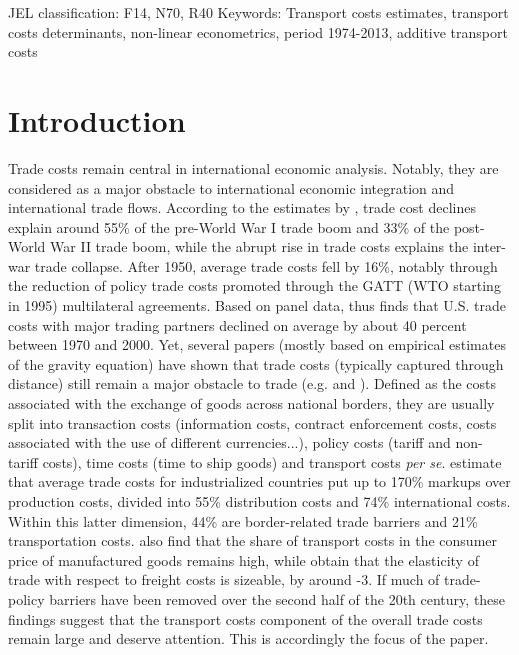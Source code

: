 \documentclass[a4paper,11pt]{article}
\begin{document}
\thispagestyle{empty} \pagestyle{plain} \setcounter{page}{1}



{\normalsize JEL classification: F14, N70, R40\newline
Keywords: Transport costs estimates, transport costs determinants, non-linear econometrics, period 1974-2013, additive transport costs }

{\normalsize \vspace{0cm} }

{\normalsize \titlepage }

{\normalsize \newpage }


\section{Introduction}


\noindent Trade costs remain central in international economic analysis. Notably, they are considered as a major obstacle to international economic integration and international trade flows. According to the estimates by \citet{Jacks08}, trade cost declines explain around 55\% of the pre-World War I trade boom and 33\% of the post-World War II trade boom, while the abrupt rise in trade costs explains the inter-war trade collapse. After 1950, average trade costs fell by 16\%, notably through the reduction of policy trade costs promoted through the GATT (WTO starting in 1995) multilateral agreements. Based on panel data, \citet{novy13} thus finds  that U.S. trade costs with major trading partners declined on average by about 40 percent between 1970 and 2000. Yet, several papers (mostly based on empirical estimates of the gravity equation) have shown that trade costs (typically captured through distance) still remain a major obstacle to trade (e.g. \citealp{Head_Mayer04} and \citealp{Disdier_Head08}). Defined as the costs associated with the exchange of goods across national borders, they are usually split into transaction costs (information costs, contract enforcement costs, costs associated with the use of different currencies...), policy costs (tariff  and non-tariff costs), time costs (time to ship goods) and transport costs \emph{per se}. \citet{anderson_wincoop_jel} estimate that average trade costs for industrialized countries put up to 170\% markups over production costs, divided into 55\% distribution costs and 74\% international costs. Within this latter dimension, 44\% are border-related trade barriers and 21\% transportation costs. \citet{Lafourcade_Thisse} also find that the share of transport costs in the consumer price of manufactured goods remains high, while \citet{Behar_Venables} obtain that the elasticity of trade with respect to freight costs is sizeable, by around -3. If much of trade-policy barriers have been removed over the second half of the 20th century, these findings suggest that the transport costs component of the overall trade costs remain large and deserve attention. This is accordingly the focus of the paper.\smallskip
\end{document}
